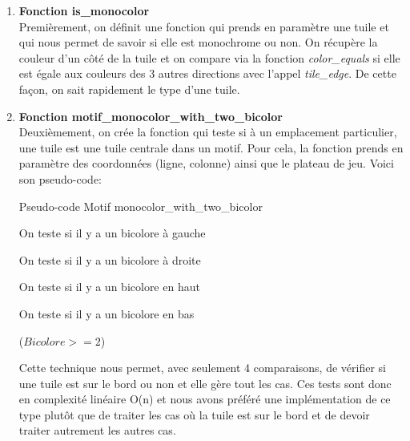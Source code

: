 \documentclass[a4paper]{article}
\begin{document}
\begin{enumerate}
    \item \textbf{Fonction is\_monocolor} \\
\newline
Premièrement, on définit une fonction qui prends en paramètre une tuile et qui nous permet de savoir si elle est monochrome ou non. On récupère la couleur d'un côté de la tuile et on compare via la fonction \emph{color\_equals} si elle est égale aux couleurs des 3 autres directions avec l'appel \emph{tile\_edge}. De cette façon, on sait rapidement le type d'une tuile.
\newline
    \item \textbf{Fonction motif\_monocolor\_with\_two\_bicolor} \\
\newline    
Deuxièmement, on crée la fonction qui teste si à un emplacement particulier, une tuile est une tuile centrale dans un motif. Pour cela, la fonction prends en paramètre des coordonnées (ligne, colonne) ainsi que le plateau de jeu. Voici son pseudo-code:

\newpage
\begin{algorithm}
    \caption{Pseudo-code Motif monocolor\_with\_two\_bicolor}
    \begin{algorithmic}
            \RETURN \FALSE
        \ENDIF
        
            \STATE On teste si il y a un bicolore à gauche
        \ENDIF
    
            \STATE On teste si il y a un bicolore à droite
        \ENDIF
        
            \STATE On teste si il y a un bicolore en haut
        \ENDIF
        
            \STATE On teste si il y a un bicolore en bas
        \ENDIF
        
        \RETURN ($Bicolore >= 2$)

    \end{algorithmic}
\end{algorithm}

Cette technique nous permet, avec seulement 4 comparaisons, de vérifier si une tuile est sur le bord ou non et elle gère tout les cas. Ces tests sont donc en complexité linéaire O(n) et nous avons préféré une implémentation de ce type plutôt que de traiter les cas où la tuile est sur le bord et de devoir traiter autrement les autres cas. \\


\end{enumerate}
\end{document}
